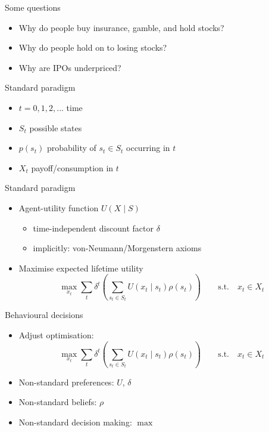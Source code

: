 \begin{frame}{Some questions}
    \begin{itemize}
        \item Why do people buy insurance, gamble, and hold stocks?\bigskip
        \item Why do people hold on to losing stocks?\bigskip
        \item Why are IPOs underpriced?\bigskip
    \end{itemize}
\end{frame}

\begin{frame}{Standard paradigm}
    \begin{itemize}
        \item $t= 0,1,2,...$ time\bigskip
        \item $S_t$ possible states\bigskip
        \item $p(s_t)$ probability of $s_t \in S_t$ occurring in $t$\bigskip
        \item $X_t$ payoff/consumption in $t$\bigskip
    \end{itemize}
\end{frame}

\begin{frame}{Standard paradigm}
\begin{itemize}
    \item Agent-utility function $U(X\mid S)$\medskip
    \begin{itemize}
\item time-independent discount factor $\delta $\medskip
\item implicitly: von-Neumann/Morgenstern axioms\medskip
\end{itemize}\bigskip

    \item Maximise expected lifetime utility\medskip
	\[\max_{x_t} \sum_t  \delta^t \left(\sum_{s_t \in S_t} U(x_t \mid s_t)\rho (s_t) \right) \qquad \text{s.t.} \quad x_t \in X_t\]
   \end{itemize}
\end{frame}


\begin{frame}{Behavioural decisions}
\begin{itemize}
\item Adjust optimisation:
	\[\max_{x_t} \sum_t  \delta^t \left(\sum_{s_t \in S_t} U(x_t \mid s_t)\rho (s_t) \right) \qquad \text{s.t.} \quad x_t \in X_t\]\bigskip
        \item Non-standard preferences: $U$, $\delta $\bigskip
        \item Non-standard beliefs: $\rho$\bigskip
        \item Non-standard decision making: $\max$\bigskip
\end{itemize}
\end{frame}


